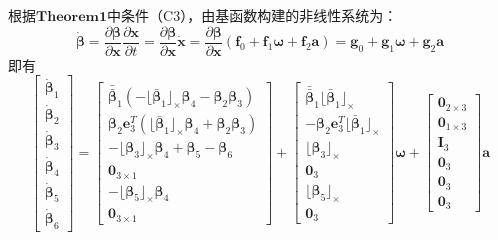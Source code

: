 \documentclass{article}
\begin{document}
\par
根据$\textbf{Theorem1}$中条件（C3），由基函数构建的非线性系统为：
\begin{equation}
    \dot{\mathbf{\beta}}=\frac{\partial\mathbf{\beta}}{\partial\textbf{x}}\frac{\partial\textbf{x}}{\partial t}
    =\frac{\partial\mathbf{\beta}}{\partial\textbf{x}}\dot{\mathbf{x}}
    =\frac{\partial\mathbf{\beta}}{\partial\textbf{x}}(\textbf{f}_{0}+\textbf{f}_{1}\mathbf{\omega}+\textbf{f}_{2}\mathbf{a})
    =\textbf{g}_0+\textbf{g}_{1}\mathbf{\omega}+\textbf{g}_{2}\textbf{a}
\end{equation}
即有
\begin{equation}\label{eqs:nonlinearsys3}
    \left[\begin{array}{c}\dot{\mathbf{\beta}}_1\\ \dot{\mathbf{\beta}}_2\\
    \dot{\mathbf{\beta}}_3\\ \dot{\mathbf{\beta}}_4\\
    \dot{\mathbf{\beta}}_5\\ \dot{\mathbf{\beta}}_6
    \end{array}\right]
    =\left[\begin{array}{c}\bar{\bar{\mathbf{\beta}}}_{1}(-\lfloor\bar{\mathbf{\beta}}_{1}\rfloor_{\times}\mathbf{\beta}_{4}
    -\mathbf{\beta}_{2}\mathbf{\beta}_3) \\
    \mathbf{\beta}_{2}\textbf{e}_{3}^{T}(\lfloor\bar{\mathbf{\beta}}_1\rfloor_{\times}\mathbf{\beta}_{4}
    +\mathbf{\beta}_{2}\mathbf{\beta}_{3})\\
    -\lfloor\mathbf{\beta}_3\rfloor_{\times}\mathbf{\beta}_{4}+\mathbf{\beta}_5-\mathbf{\beta}_6\\
    \textbf{0}_{3\times 1}\\
    -\lfloor\mathbf{\beta}_5\rfloor_{\times}\mathbf{\beta}_4\\\textbf{0}_{3\times 1}
    \end{array}\right]
    +\left[\begin{array}{c} \bar{\bar{\mathbf{\beta}}}_{1}\lfloor\bar{\mathbf{\beta}}_{1}\rfloor_{\times}\\
    -\mathbf{\beta}_{2}\textbf{e}_{3}^{T}\lfloor\bar{\mathbf{\beta}}_{1}\rfloor_{\times}\\
    \lfloor\mathbf{\beta}_3\rfloor_{\times}\\\textbf{0}_3\\\lfloor\mathbf{\beta}_5\rfloor_{\times}\\
    \textbf{0}_3
    \end{array}\right]\mathbf{\omega}
    +\left[\begin{array}{c}\textbf{0}_{2\times 3}\\\textbf{0}_{1\times 3}\\\textbf{I}_3\\
    \textbf{0}_3\\\textbf{0}_3\\\textbf{0}_3 \end{array}\right]\textbf{a}
\end{equation}
\end{document}
